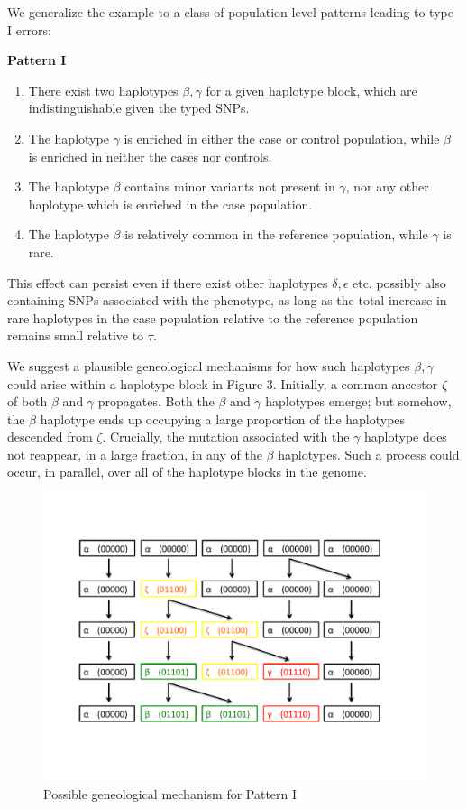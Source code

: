 \documentclass[12pt]{article}
\begin{document}
We generalize the example to a class of population-level patterns
leading to type I errors:

\noindent\textbf{Pattern I}
\begin{enumerate}
\item There exist two haplotypes $\beta, \gamma$ for a given haplotype
  block,
which are indistinguishable given the typed SNPs.
\item The haplotype $\gamma$ is enriched in either the case or control population,
while $\beta$ is enriched in neither the cases nor controls.
\item The haplotype $\beta$ contains minor variants not present in
  $\gamma$,
nor any other haplotype which is enriched in the case population.
\item The haplotype $\beta$ is relatively common in the reference
  population, while $\gamma$ is rare.
\end{enumerate}

This effect can persist
even if there exist other haplotypes $\delta,\epsilon$ etc.
possibly also containing SNPs associated with the phenotype,
as long as the total increase in rare haplotypes in
the case population relative to the reference population remains
small relative to $\tau$.

We suggest a plausible geneological mechanisms for
how such haplotypes $\beta,\gamma$ could arise within a haplotype
block in Figure 3.
Initially, a common ancestor $\zeta$ of both $\beta$ and $\gamma$
propagates.
Both the $\beta$ and $\gamma$ haplotypes emerge;
but somehow, the $\beta$ haplotype ends up occupying a large
proportion
of the haplotypes descended from $\zeta$.
Crucially, the mutation associated with the $\gamma$ haplotype
does not reappear, in a large fraction, in any of the $\beta$
haplotypes.
Such a process could occur, in parallel, over all of the haplotype
blocks in the genome.

\begin{figure}[h]
\centering
\includegraphics[scale=0.5]{impute_fig3.pdf}
\caption{Possible geneological mechanism for Pattern I}
\end{figure}
\end{document}
